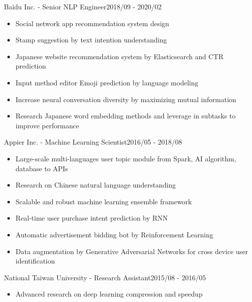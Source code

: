 \documentclass{joel_cv}
\begin{document}
\begin{profExp}{Baidu Inc. - Senior NLP Engineer}{2018/09 - 2020/02}{
        \begin{itemize}
            \item Social network app recommendation system design
            \item Stamp suggestion by text intention understanding
            \item Japanese website recommendation system by Elasticsearch and CTR prediction
            \item Input method editor Emoji prediction by language modeling
            \item Increase neural conversation diversity by maximizing mutual information
            \item Research Japanese word embedding methods and leverage in subtasks to improve performance
        \end{itemize}
    }
\end{profExp}

\begin{profExp}{Appier Inc. - Machine Learning Scientist}{2016/05 - 2018/08}{
        \begin{itemize}
            \item Large-scale multi-languages user topic module from Spark, AI algorithm, database to APIs
            \item Research on Chinese natural language understanding
            \item Scalable and robust machine learning ensemble framework
            \item Real-time user purchase intent prediction by RNN
            \item Automatic advertisement bidding bot by Reinforcement Learning
            \item Data augmentation by Generative Adversarial Networks for cross device user identification
        \end{itemize}
    }
\end{profExp}

\begin{profExp}{National Taiwan University - Research Assistant}{2015/08 - 2016/05}
    {
        \begin{itemize}
            \item Advanced research on deep learning compression and speedup
        \end{itemize}
    }
\end{profExp}
\end{document}
